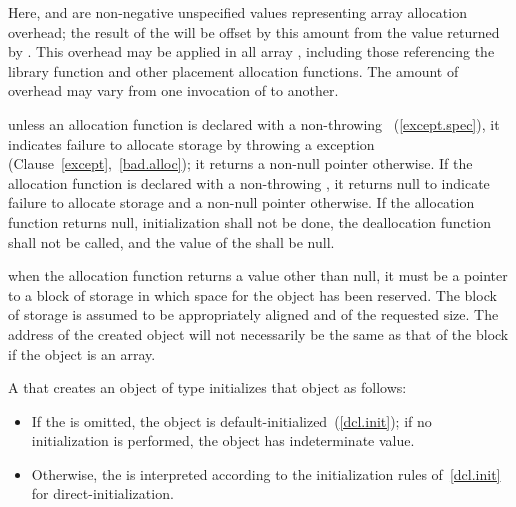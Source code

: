 Here,  and  are non-negative unspecified values
representing array allocation overhead; the result of the
 will be offset by this amount from the value
returned by . This overhead may be applied in all
array , including those referencing the
library function  and other
placement allocation functions. The amount of overhead may vary from one
invocation of  to another.
\exitexample 

\pnum
\enternote 
unless an allocation function is declared with a non-throwing
~(\ref{except.spec}),
it indicates failure to allocate storage by throwing a
%
%
 exception (Clause~\ref{except},~\ref{bad.alloc});
it returns a non-null pointer otherwise. If the allocation function is
declared with a non-throwing ,
it returns null to indicate failure to allocate storage
and a non-null pointer otherwise.
\exitnote 
If the allocation function returns null, initialization shall not be
done, the deallocation function shall not be called, and the value of
the  shall be null.

\pnum
\enternote 
when the allocation function returns a value other than null, it must be
a pointer to a block of storage in which space for the object has been
reserved. The block of storage is assumed to be appropriately aligned
and of the requested size. The address of the created object will not
necessarily be the same as that of the block if the object is an array.
\exitnote 

\pnum
{}%
%
%
%
%
%
%
A  that creates an object of type 
initializes that object as follows:

\begin{itemize}
\item If the  is omitted, the object is
default-initialized~(\ref{dcl.init}); if no initialization is performed, the
object has indeterminate value.

\item Otherwise, the  is interpreted according to
the initialization rules of~\ref{dcl.init} for direct-initialization.
\end{itemize}

